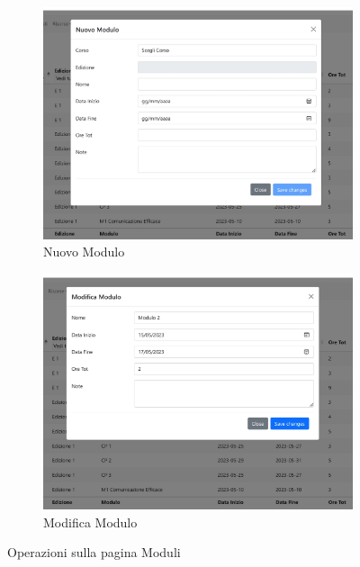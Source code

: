 \begin{figure}[!hbt]
\centering
 \begin{subfigure}{0.49\textwidth}
     \includegraphics[width=\textwidth]{img/screen/Moduli_aggiungi-1.jpg}
     \caption{Nuovo Modulo}
     \label{fig:nuovo_modulo}
 \end{subfigure}
 \hfill
 \begin{subfigure}{0.49\textwidth}
     \includegraphics[width=\textwidth]{img/screen/Moduli_modifica-1.jpg}
     \caption{Modifica Modulo}
     \label{fig:modifica_modulo}
 \end{subfigure}
\caption{Operazioni sulla pagina Moduli}
\label{fig:operazioni_moduli}
\end{figure}
\newline
